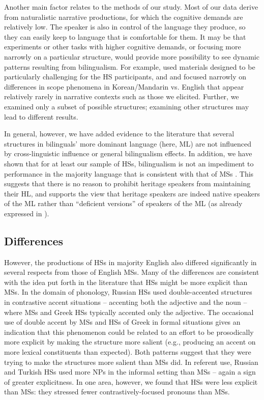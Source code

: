 \documentclass[output=paper,colorlinks,citecolor=brown]{langscibook}
\begin{document}
Another main factor relates to the methods of our study. Most of our data derive from naturalistic narrative productions, for which the cognitive demands are relatively low. The speaker is also in control of the language they produce, so they can easily keep to language that is comfortable for them. It may be that experiments or other tasks with higher cognitive demands, or focusing more narrowly on a particular structure, would provide more possibility to see dynamic patterns resulting from bilingualism. For example, \citet{Bylund2012} used materials designed to be particularly challenging for the HS participants, and \citet{Lee2011} and \citet{Scontras2017} focused narrowly on differences in scope phenomena in Korean/Mandarin vs. English that appear relatively rarely in narrative contexts such as those we elicited. Further, we examined only a subset of possible structures; examining other structures may lead to different results.

In general, however, we have added evidence to the literature that several structures in bilinguals’ more dominant language (here, ML) are not influenced by cross-linguistic influence or general bilingualism effects. In addition, we have shown that for at least our sample of HSs, bilingualism is not an impediment to performance in the majority language that is consistent with that of MSs \parencite{flege1999, Ventureyra2004, macwhinney2005}. This suggests that there is no reason to prohibit heritage speakers from maintaining their HL, and supports the view that heritage speakers are indeed native speakers of the ML rather than “deficient versions” of speakers of the ML (as already expressed in \cite{rothman2014, Montrul2016, kupisch2018, tsehaye2021, wiese2022}).


\subsection{Differences} \label{sec:pashkovaetal:Differences}

However, the productions of HSs in majority English also differed significantly in several respects from those of English MSs. Many of the differences are consistent with the idea put forth in the literature that HSs might be more explicit than MSs. In the domain of phonology, Russian HSs used double-accented structures in contrastive accent situations -- accenting both the adjective and the noun -- where MSs and Greek HSs typically accented only the adjective. The occasional use of double accent by MSs and HSs of Greek in formal situations gives an indication that this phenomenon could be related to an effort to be prosodically more explicit by making the structure more salient (e.g., producing an accent on more lexical constituents than expected). Both patterns suggest that they were trying to make the structures more salient than MSs did. In referent use, Russian and Turkish HSs used more NPs in the informal setting than MSs -- again a sign of greater explicitness. In one area, however, we found that HSs were less explicit than MSs: they stressed fewer contrastively-focused pronouns than MSs.
\end{document}
